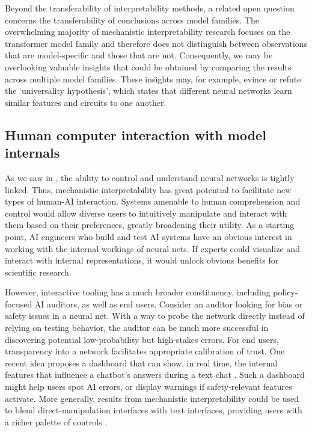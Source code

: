 Beyond the transferability of interpretability methods, a related open question concerns the transferability of conclusions across model families. The overwhelming majority of mechanistic interpretability research focuses on the transformer model family and therefore does not distinguish between observations that are model-specific and those that are not. Consequently, we may be overlooking valuable insights that could be obtained by comparing the results across multiple model families. These insights may, for example, evince or refute the `universality hypothesis', which states that \citep{li2016convergentlearningdifferentneural,olah2020zoom} different neural networks learn similar features and circuits to one another.


\subsection{Human computer interaction with model internals}
\label{subsec:human-computer-interaction}

As we saw in , the ability to control and understand neural networks is tightly linked. Thus, mechanistic interpretability has great potential to facilitate new types of human-AI interaction. Systems amenable to human comprehension and control would allow diverse users to intuitively manipulate and interact with them based on their preferences, greatly broadening their utility. As a starting point, AI engineers who build and test AI systems have an obvious interest in working with the internal workings of neural nets. If experts could visualize and interact with internal representations, it would unlock obvious benefits for scientific research.

However, interactive tooling has a much broader constituency, including policy-focused AI auditors, as well as end users. Consider an auditor looking for bias or safety issues in a neural net. With a way to probe the network directly instead of relying on testing behavior, the auditor can be much more successful in discovering potential low-probability but high-stakes errors. For end users, transparency into a network facilitates appropriate calibration of trust. One recent idea proposes a dashboard that can show, in real time, the internal features that influence a chatbot's answers during a text chat \citep{chen2024designingdashboardtransparencycontrol,zou2023representationengineeringtopdownapproach, viégas2023modelusermodelexploring}. Such a dashboard might help users spot AI errors, or display warnings if safety-relevant features activate. More generally, results from mechanistic interpretability could be used to blend direct-manipulation interfaces with text interfaces, providing users with a richer palette of controls \citep{carter2017using}.